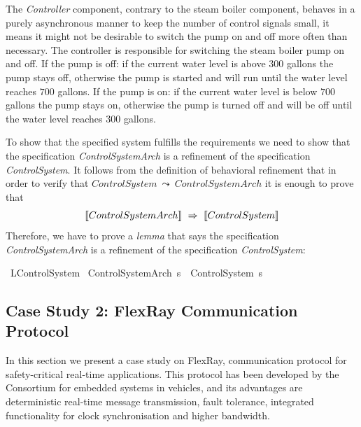 The   \emph{Controller}  component, 
contrary to the steam boiler component, 
 behaves in a purely asynchronous manner to keep
the number of control signals small, it means it might not be
desirable to switch the pump on and off more often than necessary.
The controller is responsible for
switching the steam boiler pump on and off. 
% 
If the pump is off: 
if the current water level is above $300$ gallons 
the pump stays off, otherwise the pump is started 
and will run until the water level reaches $700$ gallons. 
% 
If the pump is on: if the current water level is below $700$ gallons 
the pump stays on, otherwise the pump is turned off 
and will be off until the water level reaches $300$ gallons.

To show that the specified system fulfills the requirements we need to show that
the specification \emph{ControlSystemArch} is a refinement of the specification \emph{ControlSystem}. 
It follows from the definition of behavioral refinement that in order to verify that 
$
ControlSystem~ \leadsto ~ ControlSystemArch
$
it is enough to prove that
$$
\tlangle ControlSystemArch\trangle~ \Rightarrow ~\tlangle ControlSystem\trangle
$$
% 
Therefore, we have to  prove a \emph{lemma} 
that says the specification \emph{ControlSystemArch} is a refinement of the specification \emph{ControlSystem}:\\


\begin{isabellebody}%
\isamarkupfalse%
\ L{}{\isacharunderscore}ControlSystem{\isacharcolon} 
{\isasymlbrakk}\ ControlSystemArch\ s{\isasymrbrakk}\ {\isasymLongrightarrow}\ ControlSystem\ s\\
\end{isabellebody}%



\subsection{Case Study 2: FlexRay Communication Protocol}

In this section we present a case study on FlexRay, 
communication protocol for safety-critical real-time applications. 
This protocol has been developed by the \fr Consortium \cite{FlexRayConsortium} 
for embedded systems in vehicles, and its advantages  
are deterministic real-time message transmission, fault tolerance, 
integrated functionality for clock synchronisation and higher bandwidth.

